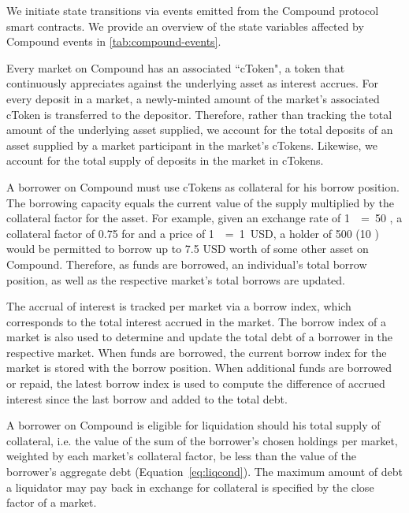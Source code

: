 

We initiate state transitions via events emitted from the Compound protocol smart contracts.
We provide an overview of the state variables affected by Compound events in \autoref{tab:compound-events}.

Every market on Compound has an associated ``cToken", a token that continuously appreciates against the underlying asset as interest accrues.
For every deposit in a market, a newly-minted amount of the market's associated cToken is transferred to the depositor.
Therefore, rather than tracking the total amount of the underlying asset supplied, we account for the total deposits of an asset supplied by a market participant in the market's cTokens.
Likewise, we account for the total supply of deposits in the market in cTokens.


A borrower on Compound must use cTokens as collateral for his borrow position.
The borrowing capacity equals the current value of the supply multiplied by the collateral factor for the asset.
For example, given an exchange rate of 1~~=~50 , a collateral factor of 0.75 for  and a price of 1~~=~1~USD, a holder of 500  (10 ) would be permitted to borrow up to 7.5 USD worth of some other asset on Compound. 
Therefore, as funds are borrowed, an individual's total borrow position, as well as the respective market's total borrows are updated.

The accrual of interest is tracked per market via a borrow index, which corresponds to the total interest accrued in the market.
The borrow index of a market is also used to determine and update the total debt of a borrower in the respective market.
When funds are borrowed, the current borrow index for the market is stored with the borrow position.
When additional funds are borrowed or repaid, the latest borrow index is used to compute the difference of accrued interest since the last borrow and added to the total debt.

A borrower on Compound is eligible for liquidation should his total supply of collateral, i.e. the value of the sum of the borrower's chosen holdings per market, weighted by each market's collateral factor, be less than the value of the borrower's aggregate debt (Equation~\eqref{eq:liqcond}).
The maximum amount of debt a liquidator may pay back in exchange for collateral is specified by the close factor of a market.
